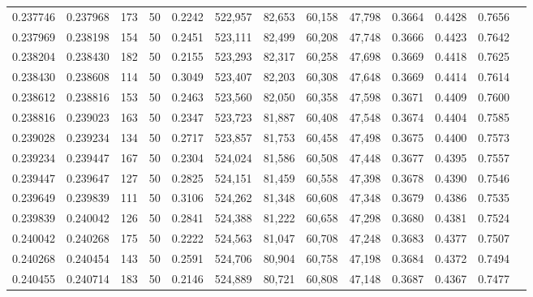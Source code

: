 \begin{tabular}{rrrrrrrrrrrrr}
0.237746 & 0.237968 &   173 &  50 &                                     0.2242 & 522,957 &  82,653 &  60,158 &  47,798 & 0.3664 & 0.4428 & 0.7656 \\
0.237969 & 0.238198 &   154 &  50 &                                     0.2451 & 523,111 &  82,499 &  60,208 &  47,748 & 0.3666 & 0.4423 & 0.7642 \\
0.238204 & 0.238430 &   182 &  50 &                                     0.2155 & 523,293 &  82,317 &  60,258 &  47,698 & 0.3669 & 0.4418 & 0.7625 \\
0.238430 & 0.238608 &   114 &  50 &                                     0.3049 & 523,407 &  82,203 &  60,308 &  47,648 & 0.3669 & 0.4414 & 0.7614 \\
0.238612 & 0.238816 &   153 &  50 &                                     0.2463 & 523,560 &  82,050 &  60,358 &  47,598 & 0.3671 & 0.4409 & 0.7600 \\
0.238816 & 0.239023 &   163 &  50 &                                     0.2347 & 523,723 &  81,887 &  60,408 &  47,548 & 0.3674 & 0.4404 & 0.7585 \\
0.239028 & 0.239234 &   134 &  50 &                                     0.2717 & 523,857 &  81,753 &  60,458 &  47,498 & 0.3675 & 0.4400 & 0.7573 \\
0.239234 & 0.239447 &   167 &  50 &                                     0.2304 & 524,024 &  81,586 &  60,508 &  47,448 & 0.3677 & 0.4395 & 0.7557 \\
0.239447 & 0.239647 &   127 &  50 &                                     0.2825 & 524,151 &  81,459 &  60,558 &  47,398 & 0.3678 & 0.4390 & 0.7546 \\
0.239649 & 0.239839 &   111 &  50 &                                     0.3106 & 524,262 &  81,348 &  60,608 &  47,348 & 0.3679 & 0.4386 & 0.7535 \\
0.239839 & 0.240042 &   126 &  50 &                                     0.2841 & 524,388 &  81,222 &  60,658 &  47,298 & 0.3680 & 0.4381 & 0.7524 \\
0.240042 & 0.240268 &   175 &  50 &                                     0.2222 & 524,563 &  81,047 &  60,708 &  47,248 & 0.3683 & 0.4377 & 0.7507 \\
0.240268 & 0.240454 &   143 &  50 &                                     0.2591 & 524,706 &  80,904 &  60,758 &  47,198 & 0.3684 & 0.4372 & 0.7494 \\
0.240455 & 0.240714 &   183 &  50 &                                     0.2146 & 524,889 &  80,721 &  60,808 &  47,148 & 0.3687 & 0.4367 & 0.7477 \\

\end{tabular}
